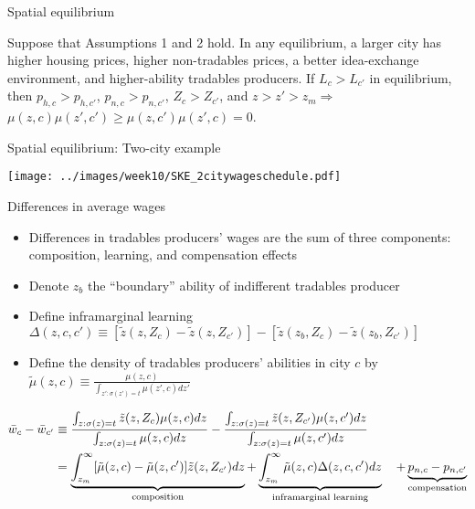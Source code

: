 \documentclass[11pt,notes=hide,aspectratio=169]{beamer}
\begin{document}
\begin{frame}{Spatial equilibrium}
\begin{proposition} \label{prop:crosscitycharacteristics}
Suppose that Assumptions 1 and 2 hold. In any equilibrium, a larger city has higher housing prices, higher non-tradables prices, a better idea-exchange environment, and higher-ability tradables producers. If $L_c > L_{c'}$ in equilibrium, then $p_{h,c}>p_{h,c'}$, $p_{n,c}>p_{n,c'}$, $Z_c>Z_{c'}$, and $z>z'>z_m \Rightarrow$ $\mu(z,c)\mu(z',c')\geq\mu(z,c')\mu(z',c)=0$.
\end{proposition}
\end{frame}
\begin{frame}{Spatial equilibrium: Two-city example}
\begin{center}
\texttt{[image: ../images/week10/SKE\_2citywageschedule.pdf]}
\end{center}
\end{frame}
\begin{frame}{Differences in average wages}
\begin{itemize}
	\item Differences in tradables producers' wages are the sum of three components: composition, learning, and compensation effects
	\item Denote $z_b$ the ``boundary'' ability of indifferent tradables producer
	\item Define inframarginal learning $\Delta(z,c,c')\equiv\left[\tilde{z}(z,Z_{c})-\tilde{z}(z,Z_{c'})\right]-\left[\tilde{z}(z_{b},Z_{c})-\tilde{z}(z_{b},Z_{c'})\right]$
	\item Define the density of tradables producers' abilities in city $c$ by $\tilde{\mu}(z,c)\equiv\frac{\mu(z,c)}{\int_{z':\sigma(z')=t}\mu(z',c)dz'}$
\end{itemize}
\begin{align*}
\bar{w}_{c}-\bar{w}_{c'} 
&
\equiv \frac{\int_{z:\sigma(z)=t}\tilde{z}(z,Z_{c})\mu(z,c)dz}{\int_{z:\sigma(z)=t}\mu(z,c)dz}-\frac{\int_{z:\sigma(z)=t}\tilde{z}(z,Z_{c'})\mu(z,c')dz}{\int_{z:\sigma(z)=t}\mu(z,c')dz} 
\\
& 
=\underbrace{\int_{z_m}^{\infty}[\tilde{\mu}(z,c)-\tilde{\mu}(z,c')]\tilde{z}(z,Z_{c'})dz}_{\textnormal{composition}} + \underbrace{\int_{z_m}^{\infty}\tilde{\mu}(z,c)\Delta(z,c,c')dz}_{\textnormal{inframarginal learning}} 
\quad +\underbrace{p_{n,c}-p_{n,c'}}_{\textnormal{compensation}}
\end{align*}
\end{frame}
\end{document}
